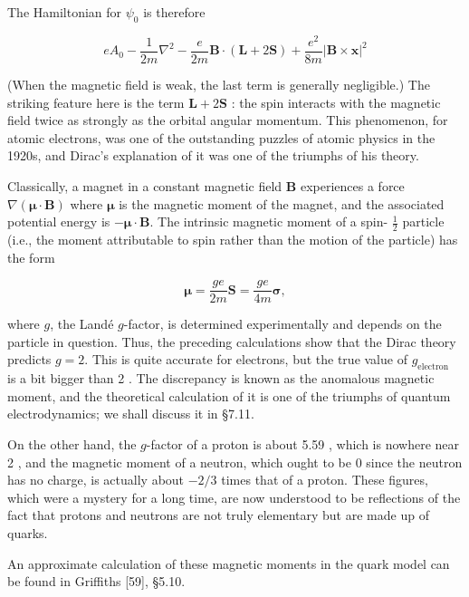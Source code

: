 \documentclass[10pt, letterpaper]{article}
\begin{document}
The Hamiltonian for $\psi_{0}$ is therefore

$$
e A_{0}-\frac{1}{2 m} \nabla^{2}-\frac{e}{2 m} \mathbf{B} \cdot(\mathbf{L}+2 \mathbf{S})+\frac{e^{2}}{8 m}|\mathbf{B} \times \mathbf{x}|^{2}
$$

(When the magnetic field is weak, the last term is generally negligible.) The striking feature here is the term $\mathbf{L}+2 \mathbf{S}$ : the spin interacts with the magnetic field twice as strongly as the orbital angular momentum. This phenomenon, for atomic electrons, was one of the outstanding puzzles of atomic physics in the 1920s, and Dirac's explanation of it was one of the triumphs of his theory.

Classically, a magnet in a constant magnetic field $\mathbf{B}$ experiences a force $\nabla(\boldsymbol{\mu} \cdot \mathbf{B})$ where $\boldsymbol{\mu}$ is the magnetic moment of the magnet, and the associated potential energy is $-\boldsymbol{\mu} \cdot \mathbf{B}$. The intrinsic magnetic moment of a spin- $\frac{1}{2}$ particle (i.e., the moment attributable to spin rather than the motion of the particle) has the form

$$
\boldsymbol{\mu}=\frac{g e}{2 m} \mathbf{S}=\frac{g e}{4 m} \boldsymbol{\sigma},
$$

where $g$, the Landé $g$-factor, is determined experimentally and depends on the particle in question. Thus, the preceding calculations show that the Dirac theory predicts $g=2$. This is quite accurate for electrons, but the true value of $g_{\text {electron }}$ is a bit bigger than 2 . The discrepancy is known as the anomalous magnetic moment, and the theoretical calculation of it is one of the triumphs of quantum electrodynamics; we shall discuss it in §7.11.

On the other hand, the $g$-factor of a proton is about 5.59 , which is nowhere near 2 , and the magnetic moment of a neutron, which ought to be 0 since the neutron has no charge, is actually about $-2 / 3$ times that of a proton. These figures, which were a mystery for a long time, are now understood to be reflections of the fact that protons and neutrons are not truly elementary but are made up of quarks.

An approximate calculation of these magnetic moments in the quark model can be found in Griffiths [59], §5.10.
\end{document}
